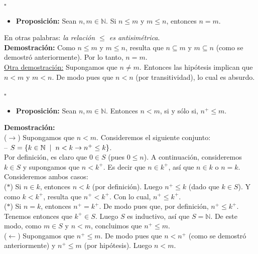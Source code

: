\documentclass[10 pt]{article}
\begin{document}
\begin{flushright}
    $\square$
\end{flushright}

\begin{itemize}
    \item \Large{\textbf{Proposición:} Sean $n,m \in \mathbb N$. Si $n \leq m$ y $m \leq n$, entonces $n=m$.} \\
\end{itemize}

\Large{En otras palabras: \textit{la relación $\leq$ es antisimétrica}.} \\

\Large{\textbf{Demostración:} Como $n \leq m$ y $m \leq n$, resulta que $n \subseteq m$ y $m \subseteq n$ (como se demostró anteriormente). Por lo tanto, $n=m$. \\

\underline{Otra demostración:} Supongamos que $n \neq m$. Entonces las hipótesis implican que $n<m$ y $m<n$. De modo pues que $n<n$ (por transitividad), lo cual es absurdo.} \\

\begin{flushright}
    $\square$
\end{flushright}

\begin{itemize}
    \item \Large{\textbf{Proposición:} Sean $n,m \in \mathbb N$. Entonces $n<m$, si y sólo si, $n^+ \leq m$.} \\
\end{itemize} 

\Large{\textbf{Demostración:} \\

($\rightarrow$) Supongamos que $n<m$. Consideremos el siguiente conjunto: \\

-- $S=\{k \in \mathbb N \hspace{0.2 cm}|\hspace{0.2 cm}n<k \rightarrow n^+ \leq k\}$. \\

Por definición, es claro que $0 \in S$ (pues $0 \leq n$). A continuación, consideremos $k \in S$ y supongamos que $n<k^+$. Es decir que $n \in k^+$, así que $n \in k$ o $n=k$. Consideremos ambos casos: \\

($\ast$) Si $n \in k$, entonces $n<k$ (por definición). Luego $n^+ \leq k$ (dado que $k \in S$). Y como $k<k^+$, resulta que $n^+<k^+$. Con lo cual, $n^+ \leq k^+$. \\

($\ast$) Si $n=k$, entonces $n^+=k^+$. De modo pues que, por definición, $n^+ \leq k^+$. \\

Tenemos entonces que $k^+ \in S$. Luego $S$ es inductivo, así que $S=\mathbb N$. De este modo, como $m \in S$ y $n<m$, concluimos que $n^+ \leq m$. \\

($\leftarrow$) Supongamos que $n^+ \leq m$. De modo pues que $n<n^+$ (como se demostró anteriormente) y $n^+ \leq m$ (por hipótesis). Luego $n<m$.} \\
\end{document}
